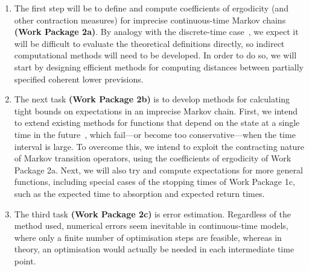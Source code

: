 \documentclass[11pt,dvipsnames,usenames,a4paper]{article}
\begin{document}
\begin{enumerate}[label=\tiny$\blacksquare$,leftmargin=*,noitemsep]
\item The first step will be to define and compute coefficients of ergodicity (and other contraction measures) for imprecise continuous-time Markov chains {\bf(Work Package 2a)}. 
By analogy with the discrete-time case~\cite{skulj2013}, we expect it will be difficult to evaluate the theoretical definitions directly, so indirect computational methods will need to be developed. 
In order to do so, we will start by designing efficient methods for computing distances between partially specified coherent lower previsions. 
\item The next task {\bf(Work Package 2b)} is to develop methods for calculating tight bounds on expectations %
in
an imprecise Markov chain. 
First, we intend to extend existing methods for functions that depend on the state at a single time in the future~\cite{skulj2015,erreygers2017:ictmcs}, which fail---or become too conservative---when the time interval is large. 
To overcome this, we intend to exploit the contracting nature of Markov transition operators, using the coefficients of ergodicity of Work Package 2a. 
Next, we will also try and compute expectations for more general functions, including special cases of the stopping times of Work Package 1c, such as the expected time to absorption and expected return times.%
\item The third task {\bf(Work Package 2c)} is error estimation.
Regardless of the method used, numerical errors seem inevitable in continuous-time models, where only a finite number of optimisation steps are feasible, whereas in theory, an optimisation would actually be needed in each intermediate time point. 

\end{enumerate}
\end{document}
